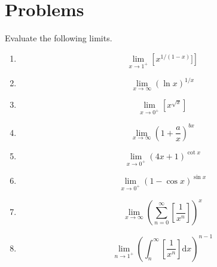 \documentclass[12pt, A4]{report}
\renewcommand{\d}{\text{d}}
\begin{document}
		\section*{Problems}
			Evaluate the following limits.
			\begin{enumerate}
				\item
					\[\lim_{x\to 1^+}\left[x^{1/(1 - x)}]\right]\]
					\item
					\[\lim_{x\to\infty}(\ln x)^{1/x}\]
				\item
					\[\lim_{x\to 0^+}\left[x^{\sqrt{x}}\right]\]
				\item
					\[\lim_{x\to\infty}\left(1 + \frac{a}{x}\right)^{bx}\]
				\item
					\[\lim_{x\to 0^+}(4x + 1)^{\cot x}\]
				\item
					\[\lim_{x\to 0^+}(1 - \cos x)^{\sin x}\]
				\item
					\[\lim_{x\to \infty}\left(\sum_{n = 0}^\infty\left[\frac{1}{x^n}\right]\right)^x\]
				\item
					\[\lim_{n\to 1^+}\left(\int_n^\infty\left[\frac{1}{x^n}\right]\d x\right)^{n - 1}\]
			\end{enumerate}
			\newpage
\end{document}

